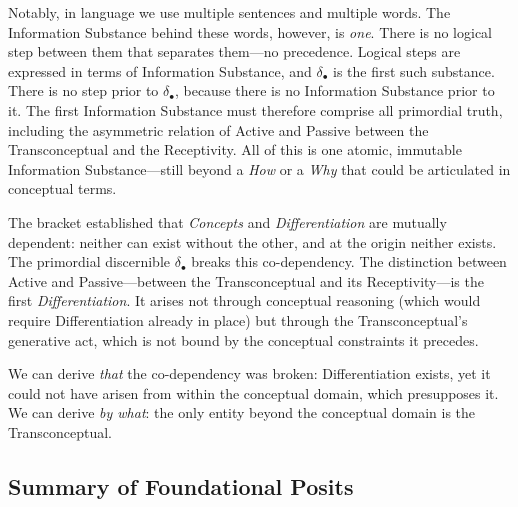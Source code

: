 \documentclass[11pt, a4paper]{article}
\theoremstyle{formalism}
\begin{document}
Notably, in language we use multiple sentences and multiple words. The
Information Substance behind these words, however, is \textit{one}. There is
no logical step between them that separates them---no precedence. Logical
steps are expressed in terms of Information Substance, and $\delta_\bullet$
is the first such substance. There is no step prior to $\delta_\bullet$,
because there is no Information Substance prior to it. The first Information
Substance must therefore comprise all primordial truth, including the
asymmetric relation of Active and Passive between the Transconceptual and
the Receptivity. All of this is one atomic, immutable Information
Substance---still beyond a \textit{How} or a \textit{Why} that could be
articulated in conceptual terms.

The bracket established that \textit{Concepts} and \textit{Differentiation} are
mutually dependent: neither can exist without the other, and at the origin
neither exists. The primordial discernible $\delta_\bullet$ breaks this
co-dependency. The distinction between Active and Passive---between the
Transconceptual and its Receptivity---is the first \textit{Differentiation}. It
arises not through conceptual reasoning (which would require Differentiation
already in place) but through the Transconceptual's generative act, which is
not bound by the conceptual constraints it precedes.

We can derive \textit{that} the co-dependency was broken: Differentiation
exists, yet it could not have arisen from within the conceptual domain, which
presupposes it. We can derive \textit{by what}: the only entity beyond the
conceptual domain is the Transconceptual. 

\subsection{Summary of Foundational Posits}
\end{document}
